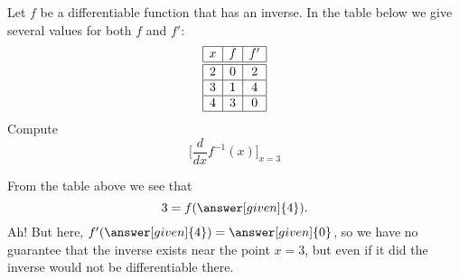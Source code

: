 \documentclass{ximera}
\begin{document}
\begin{example}
  Let $f$ be a differentiable function that has an inverse. In the
  table below we give several values for both $f$ and $f'$:
  \[
  \begin{array}{|c|c|c|}\hline
    x & f  & f' \\ \hline \hline
    2 & 0  & 2  \\ \hline
    3 & 1  & 4 \\ \hline
    4 & 3 & 0  \\ \hline
  \end{array}
  \]
  Compute
  \[
  \bigg[ \frac{d}{dx} f^{-1}(x) \bigg]_{x=3}
  \]
  \begin{explanation}
    From the table above we see that
    \[
    3 = f(\answer[given]{4}).
    \]
    Ah! But here, $f'(\answer[given]{4}) = \answer[given]{0}$, so we have no guarantee that the
    inverse exists near the point $x=3$, but even if it did the inverse would not be differentiable there.
      \end{explanation}
\end{example}
\end{document}
